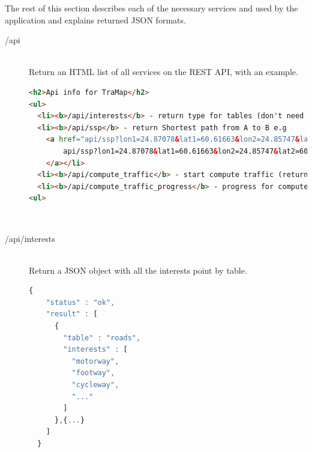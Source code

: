 The rest of this section describes each of the necessary services and used by the application and explains returned JSON formats.

\begin{description}

  \item[/api] \hfill \\ 
    Return an HTML list of all services on the REST API, with an example. \\
    \begin{lstlisting}[language=html]
<h2>Api info for TraMap</h2>
<ul>
  <li><b>/api/interests</b> - return type for tables (don't need any parameters)</li>
  <li><b>/api/ssp</b> - return Shortest path from A to B e.g
    <a href="api/ssp?lon1=24.87078&lat1=60.61663&lon2=24.85747&lat2=60.63003">
        api/ssp?lon1=24.87078&lat1=60.61663&lon2=24.85747&lat2=60.63003
    </a></li>
  <li><b>/api/compute_traffic</b> - start compute traffic (return info about start compute)</li>
  <li><b>/api/compute_traffic_progress</b> - progress for compute traffic</li>
<ul>
    \end{lstlisting} \\

  \item[/api/interests] \hfill \\ 
    Return a JSON object with all the interests point by table. \\
    \begin{lstlisting}[language=javascript]
  {
    "status" : "ok",
    "result" : [
      {
        "table" : "roads",
        "interests" : [
          "motorway",
          "footway",
          "cycleway",
          "..."
        ]
      },{...}
    ]
  }
    \end{lstlisting} \\


\end{description}
